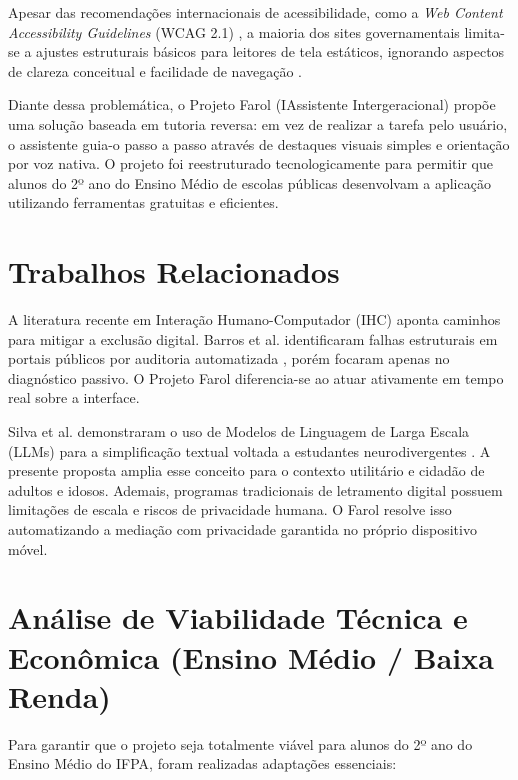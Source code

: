 \documentclass[12pt]{article}
\begin{document}
Apesar das recomendações internacionais de acessibilidade, como a \emph{Web Content Accessibility Guidelines} (WCAG 2.1) \cite{w3c_wcag21}, a maioria dos sites governamentais limita-se a ajustes estruturais básicos para leitores de tela estáticos, ignorando aspectos de clareza conceitual e facilidade de navegação \cite{wcge_govbr}.

Diante dessa problemática, o Projeto Farol (IAssistente Intergeracional) propõe uma solução baseada em tutoria reversa: em vez de realizar a tarefa pelo usuário, o assistente guia-o passo a passo através de destaques visuais simples e orientação por voz nativa. O projeto foi reestruturado tecnologicamente para permitir que alunos do 2º ano do Ensino Médio de escolas públicas desenvolvam a aplicação utilizando ferramentas gratuitas e eficientes.

\section{Trabalhos Relacionados}

A literatura recente em Interação Humano-Computador (IHC) aponta caminhos para mitigar a exclusão digital. Barros et al. identificaram falhas estruturais em portais públicos por auditoria automatizada \cite{wcge_govbr}, porém focaram apenas no diagnóstico passivo. O Projeto Farol diferencia-se ao atuar ativamente em tempo real sobre a interface.

Silva et al. demonstraram o uso de Modelos de Linguagem de Larga Escala (LLMs) para a simplificação textual voltada a estudantes neurodivergentes \cite{ctrle_2025}. A presente proposta amplia esse conceito para o contexto utilitário e cidadão de adultos e idosos. Ademais, programas tradicionais de letramento digital \cite{wics_2022} possuem limitações de escala e riscos de privacidade humana. O Farol resolve isso automatizando a mediação com privacidade garantida no próprio dispositivo móvel.

\section*{Análise de Viabilidade Técnica e Econômica (Ensino Médio / Baixa Renda)}

Para garantir que o projeto seja totalmente viável para alunos do 2º ano do Ensino Médio do IFPA, foram realizadas adaptações essenciais:
\end{document}
